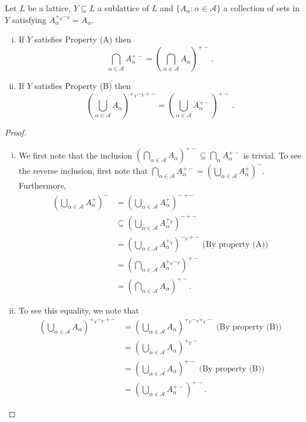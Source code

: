 \documentclass[10pt,a4paper]{amsart}
\begin{document}
\begin{prop}\label{27}
	Let $L$ be a lattice, $Y \subseteq L$ a sublattice of $L$ and $\{A_{\alpha} : \alpha \in \mathcal{A} \}$ a collection of sets in $Y$ satisfying $A_{\alpha}^{+_{Y}-_{Y}} = A_{\alpha}$.
	\begin{enumerate}[(i)]
		\item If $Y$ satisfies Property (A) then 
\[\bigcap_{\alpha \in \mathcal{A}} A_{\alpha}^{+-} = \left(\bigcap_{\alpha \in \mathcal{A}} A_{\alpha}\right)^{+-}\,.\]
		\item If $Y$ satisfies Property (B)  then 
\[\left(\bigcup_{\alpha \in \mathcal{A}} A_{\alpha}\right)^{+_{Y}-_{Y}+-} = \left(\bigcup_{\alpha \in \mathcal{A}} A_{\alpha}^{+-}\right)^{+-}\,.\]
	\end{enumerate}
\end{prop}

\begin{proof}
	\begin{enumerate}[(i)] 
		\item We first note that the inclusion $(\bigcap_{\alpha \in \mathcal{A}} A_{\alpha})^{+-} \subseteq \bigcap_{\alpha} A_{\alpha}^{+-}$ is trivial. To see the reverse inclusion, first note that $\bigcap_{\alpha \in \mathcal{A}} A_{\alpha}^{+-}  = (\bigcup_{\alpha \in \mathcal{A}} A_{\alpha}^{+})^{-}$. Furthermore,
		 \begin{align*}
			 \left(\bigcup_{\alpha \in \mathcal{A}} A_{\alpha}^{+}\right)^{-} &= \left(\bigcup_{\alpha \in \mathcal{A}} A_{\alpha}^{+}\right)^{-+-}\\
			&\subseteq \left(\bigcup_{\alpha \in \mathcal{A}} A_{\alpha}^{+_{Y}}\right)^{-+-} \\
			&=\left (\bigcup_{\alpha \in \mathcal{A}} A_{\alpha}^{+_{Y}}\right)^{-_{Y}+-} \text{ (By property (A))}\\
			&=\left (\bigcap_{\alpha \in \mathcal{A}} A_{\alpha}^{+_{Y}-_{Y}}\right)^{+-} \\
			&= \left(\bigcap_{\alpha \in \mathcal{A}} A_{\alpha}\right )^{+-}.
		\end{align*}
	\item To see this equality, we note that
	\begin{align*}
		\left(\bigcup_{\alpha \in \mathcal{A}} A_{\alpha}\right)^{+_{Y}-_{Y}+-} &= \left(\bigcup_{\alpha \in \mathcal{A}} A_{\alpha}\right)^{+_{Y}-_{Y} +_{Y}-} \text{ (By property (B))}\\
		&=\left (\bigcup_{\alpha \in \mathcal{A}} A_{\alpha}\right)^{+_{Y}-}\\
		&=\left (\bigcup_{\alpha \in \mathcal{A}} A_{\alpha}\right)^{+-} \text{ (By property (B))}\\
		&= \left(\bigcup_{\alpha \in \mathcal{A}} A_{\alpha}^{+-}\right)^{+-}.
	\end{align*}
	\end{enumerate}
\end{proof}	
\end{document}
